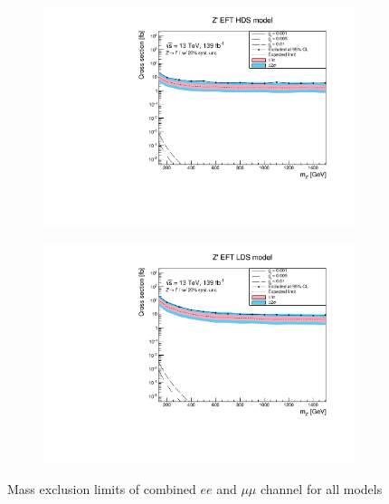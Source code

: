 \documentclass[14pt, a4paper]{book}
\begin{document}
\begin{figure}[!ht]
\begin{subfigure}[b]{0.49\textwidth}
      \includegraphics[width=1\textwidth]{Limits/EFT_HDS/mass_exclusion_comb.pdf}
   \end{subfigure}
   \hfill
   \begin{subfigure}[b]{0.49\textwidth}
      \centering
      \includegraphics[width=1\textwidth]{Limits/EFT_LDS/mass_exclusion_comb.pdf}
   \end{subfigure}
   \caption[Mass exclusion limits of combined $ee$ and $\mu\mu$ channel for all models]{Mass exclusion limits of combined $ee$ and $\mu\mu$ channel for all models}\label{fig:model_dep_exclusions}
\end{figure}
\clearpage
\end{document}
